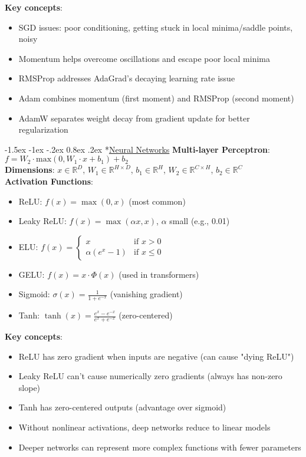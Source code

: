 \documentclass{article}
\makeatletter
\renewcommand\section{\@startsection{section}{1}{\z@}%
                                  {-1.5ex \@plus -1ex \@minus -.2ex}%
                                  {0.8ex \@plus.2ex}%
                                  {\normalfont\small\bfseries}}
\makeatother
\begin{document}
\begin{multicols}{3}
\textbf{Key concepts}:
\begin{itemize}
\item SGD issues: poor conditioning, getting stuck in local minima/saddle points, noisy
\item Momentum helps overcome oscillations and escape poor local minima
\item RMSProp addresses AdaGrad's decaying learning rate issue
\item Adam combines momentum (first moment) and RMSProp (second moment)
\item AdamW separates weight decay from gradient update for better regularization
\end{itemize}

\section*{\underline{Neural Networks}}
\textbf{Multi-layer Perceptron}: $f = W_2 \cdot \text{max}(0, W_1 \cdot x + b_1) + b_2$\\
\textbf{Dimensions}: $x \in \mathbb{R}^D$, $W_1 \in \mathbb{R}^{H \times D}$, $b_1 \in \mathbb{R}^H$, $W_2 \in \mathbb{R}^{C \times H}$, $b_2 \in \mathbb{R}^C$\\

\textbf{Activation Functions}:
\begin{itemize}
\item ReLU: $f(x) = \max(0, x)$ (most common)
\item Leaky ReLU: $f(x) = \max(\alpha x, x)$, $\alpha$ small (e.g., 0.01)
\item ELU: $f(x) = \begin{cases} x & \text{if } x > 0 \\ \alpha(e^x - 1) & \text{if } x \leq 0 \end{cases}$
\item GELU: $f(x) = x \cdot \Phi(x)$ (used in transformers)
\item Sigmoid: $\sigma(x) = \frac{1}{1+e^{-x}}$ (vanishing gradient)
\item Tanh: $\tanh(x) = \frac{e^x - e^{-x}}{e^x + e^{-x}}$ (zero-centered)
\end{itemize}

\textbf{Key concepts}:
\begin{itemize}
\item ReLU has zero gradient when inputs are negative (can cause "dying ReLU")
\item Leaky ReLU can't cause numerically zero gradients (always has non-zero slope)
\item Tanh has zero-centered outputs (advantage over sigmoid)
\item Without nonlinear activations, deep networks reduce to linear models
\item Deeper networks can represent more complex functions with fewer parameters
\end{itemize}


\end{multicols}
\end{document}
